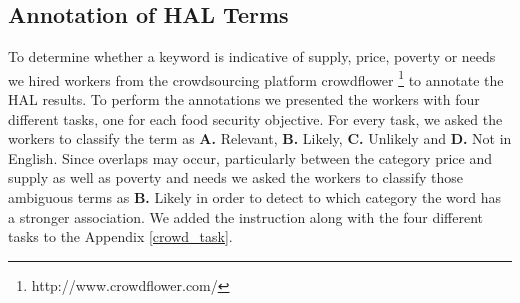 \subsection{Annotation of HAL Terms}
\label{Annotation}

To determine whether a keyword is indicative of supply, price, poverty or needs we hired workers from the crowdsourcing platform crowdflower \footnote{ http://www.crowdflower.com/} to annotate the HAL results. To perform the annotations we presented the workers with four different tasks, one for each food security objective. For every task, we asked the workers to classify the term as \textbf{A.} Relevant, \textbf{B.} Likely, \textbf{C.} Unlikely and \textbf{D.}  Not in English. Since overlaps may occur, particularly between the category price and supply as well as poverty and needs we asked the workers to classify those ambiguous terms as \textbf{B.} Likely in order to detect to which category the word has a stronger association. We added the instruction along with the four different tasks to the Appendix \ref{crowd_task}. 

